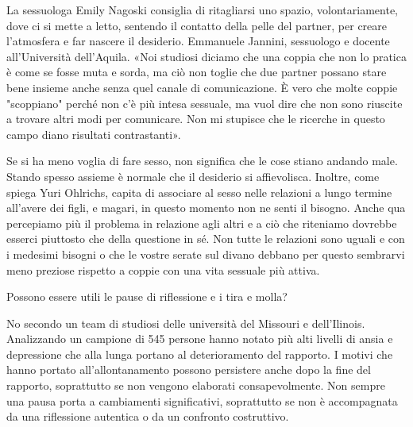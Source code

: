 \documentclass[12pt]{book} %
\begin{document}
La sessuologa Emily Nagoski
consiglia di ritagliarsi uno spazio, volontariamente, dove ci si mette a letto, sentendo il contatto della pelle del
partner, per creare l'atmosfera e far nascere il
desiderio.
Emmanuele Jannini, sessuologo e docente all'Università dell'Aquila. «Noi studiosi diciamo che una coppia che non lo pratica è come se fosse muta e sorda, ma ciò non toglie che due partner possano stare bene insieme anche senza quel canale di comunicazione. È vero che molte coppie "scoppiano" perché non c'è più intesa sessuale, ma vuol dire che non sono riuscite a trovare altri modi per comunicare. Non mi stupisce che le ricerche in questo campo diano risultati contrastanti».

Se si ha meno voglia di fare sesso, non significa che le cose stiano andando male. Stando spesso assieme è normale che
il desiderio si affievolisca. Inoltre, come spiega Yuri Ohlrichs, capita di associare al sesso nelle relazioni a lungo
termine all'avere dei figli, e magari, in questo momento non ne senti il bisogno. Anche qua
percepiamo più il problema in relazione agli altri e a ciò che riteniamo dovrebbe esserci piuttosto che della questione
in sé. Non tutte le relazioni sono uguali e con i medesimi bisogni o che le vostre serate sul divano debbano per questo
sembrarvi meno preziose rispetto a coppie con una vita sessuale più
attiva.

\begin{mdframed}[linewidth=1pt]
Possono essere utili le pause di riflessione e i tira e molla?

No secondo un team di studiosi delle università del Missouri e dell'Ilinois. Analizzando un campione di 545 persone
hanno notato più alti livelli di ansia e depressione che alla lunga portano al deterioramento del rapporto. I motivi che hanno portato all'allontanamento possono persistere anche dopo la fine del rapporto, soprattutto se non vengono elaborati consapevolmente. Non sempre una pausa porta a cambiamenti significativi, soprattutto se non è accompagnata da una riflessione autentica o da un confronto costruttivo.
\end{mdframed}
\end{document}

